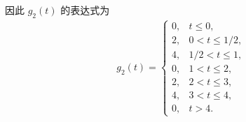 \begin{solution}
\begin{enumerate}[label=(\arabic*)]
            因此 $g_2(t)$ 的表达式为
            \begin{align*}
                g_2(t) = \begin{cases}
                    0, & t \le 0, \\
                    2, & 0 < t \le 1/2, \\
                    4, & 1/2 < t \le 1, \\
                    0, & 1 < t \le 2, \\
                    2, & 2 < t \le 3, \\
                    4, & 3 < t \le 4, \\
                    0, & t > 4.
                \end{cases}
            \end{align*}


\end{enumerate}
\end{solution}
